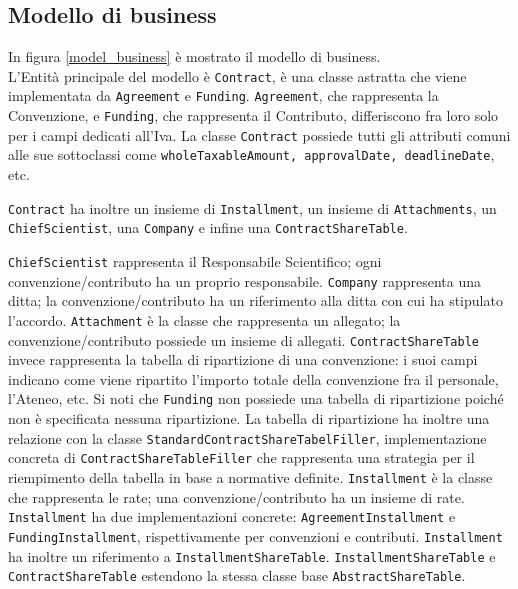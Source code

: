 \subsection{Modello di business}

In figura \ref{model_business} è mostrato il modello di business. \\

L'Entità principale del modello è \texttt{Contract}, è una classe astratta che viene implementata da \texttt{Agreement} e \texttt{Funding}.
\texttt{Agreement}, che rappresenta la Convenzione, e \texttt{Funding}, che rappresenta il Contributo, differiscono fra loro solo per i campi dedicati all'Iva. La classe \texttt{Contract} possiede tutti gli attributi comuni alle sue sottoclassi come \texttt{wholeTaxableAmount, approvalDate, deadlineDate}, etc.


\texttt{Contract} ha inoltre un insieme di \texttt{Installment}, un insieme di \texttt{Attachments}, un \texttt{ChiefScientist}, una \texttt{Company} e infine una \texttt{ContractShareTable}.

\texttt{ChiefScientist} rappresenta il Responsabile Scientifico; ogni convenzione/contributo ha un proprio responsabile.
\texttt{Company} rappresenta una ditta; la convenzione/contributo ha un riferimento alla ditta con cui ha stipulato l'accordo.
\texttt{Attachment} è la classe che rappresenta un allegato; la convenzione/contributo possiede un insieme di allegati.
\texttt{ContractShareTable} invece rappresenta la tabella di ripartizione di una convenzione: i suoi campi indicano come viene ripartito l'importo totale della convenzione fra il personale, l'Ateneo, etc. Si noti che \texttt{Funding} non possiede una tabella di ripartizione poiché non è specificata nessuna ripartizione. La tabella di ripartizione ha inoltre una relazione con la classe \texttt{StandardContractShareTabelFiller}, implementazione concreta di \texttt{ContractShareTableFiller} che rappresenta una strategia per il riempimento della tabella in base a normative definite. \texttt{Installment} è la classe che rappresenta le rate; una convenzione/contributo ha un insieme di rate. \texttt{Installment} ha due implementazioni concrete: \texttt{AgreementInstallment} e \texttt{FundingInstallment}, rispettivamente per convenzioni e contributi. \texttt{Installment} ha inoltre un riferimento a \texttt{InstallmentShareTable}. \texttt{InstallmentShareTable} e \texttt{ContractShareTable} estendono la stessa classe base \texttt{AbstractShareTable}.



